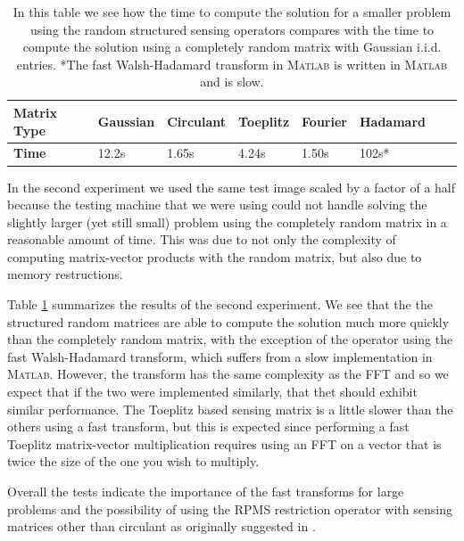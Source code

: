 \begin{table}[h]
	\begin{tabular}{l|lllllll} 
		\textbf{Matrix Type} & Gaussian & Circulant & Toeplitz & Fourier & Hadamard \\ \hline
		\textbf{Time}        & 12.2s    & 1.65s     & 4.24s    & 1.50s   & 102s*    \\ 
	\end{tabular}
	\label{tab:times}
	\caption{ In this table we see how the time to compute the
		solution for a smaller problem using the random structured sensing
		operators compares with the time to compute the solution using a completely
		random matrix with Gaussian i.i.d. entries. *The fast Walsh-Hadamard
		transform in \textsc{Matlab} is written in \textsc{Matlab} and is slow.}
	\end{table}

In the second experiment we used the same test image scaled by a factor of a
half because the testing machine that we were using could not handle solving
the slightly larger (yet still small) problem using the completely random
matrix in  a reasonable amount of time. This was due to not only the complexity
of computing matrix-vector products with the random matrix, but also due to
memory restructions.

Table \ref{tab:times} summarizes the results of the second experiment. We see
that the the structured random matrices are able to compute the solution much
more quickly than the completely random matrix, with the exception of the
operator using the fast Walsh-Hadamard transform, which suffers from a slow
implementation in \textsc{Matlab}. However, the transform has the same
complexity as the FFT and so we expect that if the two were implemented
similarly, that thet should exhibit similar performance.  The Toeplitz based
sensing matrix is a little slower than the others using a fast transform, but
this is expected since performing a fast Toeplitz matrix-vector multiplication
requires using an FFT on a vector that is twice the size of the one you wish to
multiply. 

Overall the tests indicate the importance of the fast transforms for large
problems and the possibility of using the RPMS restriction operator with
sensing matrices other than circulant as originally suggested in
\cite{romberg2009}.
